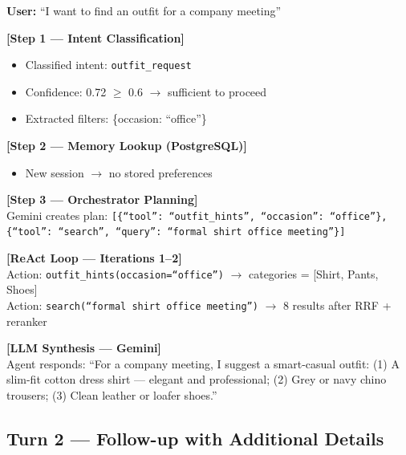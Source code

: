 \documentclass[12pt, twoside]{report}
\begin{document}
\begin{tcolorbox}[title=Turn 1 Walkthrough]
\textbf{User:} ``I want to find an outfit for a company meeting''

\textbf{[Step 1 --- Intent Classification]}
\begin{itemize}
    \item Classified intent: \texttt{outfit\_request}
    \item Confidence: 0.72 $\geq$ 0.6 $\rightarrow$ sufficient to proceed
    \item Extracted filters: \{occasion: ``office''\}
\end{itemize}

\textbf{[Step 2 --- Memory Lookup (PostgreSQL)]}
\begin{itemize}
    \item New session $\rightarrow$ no stored preferences
\end{itemize}

\textbf{[Step 3 --- Orchestrator Planning]}\\
Gemini creates plan:
\texttt{[\{``tool'': ``outfit\_hints'', ``occasion'': ``office''\}, \{``tool'': ``search'', ``query'': ``formal shirt office meeting''\}]}

\textbf{[ReAct Loop --- Iterations 1--2]}\\
Action: \texttt{outfit\_hints(occasion=``office'')} $\rightarrow$ categories = [Shirt, Pants, Shoes]\\
Action: \texttt{search(``formal shirt office meeting'')} $\rightarrow$ 8 results after RRF + reranker

\textbf{[LLM Synthesis --- Gemini]}\\
Agent responds: ``For a company meeting, I suggest a smart-casual outfit: (1) A slim-fit cotton dress shirt --- elegant and professional; (2) Grey or navy chino trousers; (3) Clean leather or loafer shoes.''
\end{tcolorbox}

\subsection{Turn 2 --- Follow-up with Additional Details}
\end{document}

